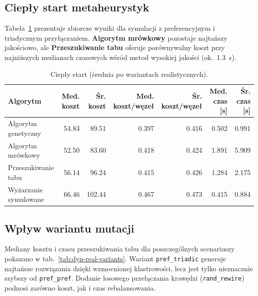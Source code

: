 \subsection{Ciepły start metaheurystyk}

Tabela~\ref{tab:dyn-real-alg} prezentuje zbiorcze wyniki dla symulacji z preferencyjnym i triadycznym przyłączaniem. \textbf{Algorytm mrówkowy} pozostaje najtańszy jakościowo, ale \textbf{Przeszukiwanie tabu} oferuje porównywalny koszt przy najniższych medianach czasowych wśród metod wysokiej jakości (ok.~1.3~s).

\begin{table}[H]
  \centering
  \caption{Ciepły start (średnia po wariantach realistycznych).}
  \label{tab:dyn-real-alg}
  \begin{tabular}{lrrrrrr}
    \toprule
    \textbf{Algorytm}     & \textbf{Med. koszt} & \textbf{Śr. koszt} & \textbf{Med. koszt/węzeł} & \textbf{Śr. koszt/węzeł} & \textbf{Med. czas [s]} & \textbf{Śr. czas [s]} \\
    \midrule
    Algorytm genetyczny   & 54.83               & 89.51              & 0.397                     & 0.416                    & 0.502                  & 0.991                 \\
    Algorytm mrówkowy     & 52.50               & 83.60              & 0.418                     & 0.424                    & 1.891                  & 5.909                 \\
    Przeszukiwanie tabu   & 56.14               & 96.24              & 0.415                     & 0.426                    & 1.284                  & 2.175                 \\
    Wyżarzanie symulowane & 66.46               & 102.44             & 0.467                     & 0.473                    & 0.415                  & 0.884                 \\
  \end{tabular}
\end{table}

\subsection{Wpływ wariantu mutacji}

Mediany kosztu i czasu przeszukiwania tabu dla poszczególnych scenariuszy pokazano w tab.~\ref{tab:dyn-real-variants}. Wariant \texttt{pref\_triadic} generuje najtańsze rozwiązania dzięki wzmocnionej klastrowości, lecz jest tylko nieznacznie szybszy od \texttt{pref\_pref}. Dodanie losowego przełączania krawędzi (\texttt{rand\_rewire}) podnosi zarówno koszt, jak i czas rebalansowania.

